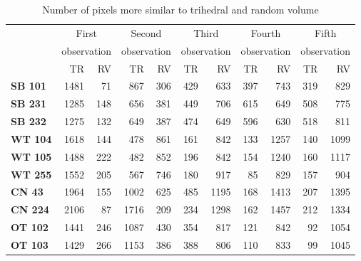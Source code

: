 \documentclass[12pt]{article}
\begin{document}
\begin{table}[hbt]
\centering
\caption{Number of pixels more similar to trihedral and random volume}\label{tab:size_sample}
\begin{tabular}{lrrrrrrrrrr}

\toprule
& \multicolumn{2}{c}{First} & \multicolumn{2}{c}{Second} & \multicolumn{2}{c}{Third} & \multicolumn{2}{c}{Fourth} & \multicolumn{2}{c}{Fifth}\\
& \multicolumn{2}{c}{observation} & \multicolumn{2}{c}{observation} & \multicolumn{2}{c}{observation} & \multicolumn{2}{c}{observation} & \multicolumn{2}{c}{observation}\\
& TR & RV & TR & RV & TR & RV & TR & RV& TR & RV\\
\cmidrule(lr){2-11}
\textbf{SB 101} & 1481 & 71 & 867 & 306 & 429 & 633 & 397 & 743 & 319 & 829\\
\textbf{SB 231} & 1285 & 148 & 656 & 381 & 449 & 706 & 615 & 649 & 508 & 775\\
\textbf{SB 232} & 1275 & 132 & 649 & 387 & 474 & 649 & 596 & 630 & 518 & 811\\
\textbf{WT 104} & 1618 & 144 & 478 & 861 & 161 & 842 & 133 & 1257 & 140 & 1099\\
\textbf{WT 105} & 1488 & 222 & 482 & 852 & 196 & 842 & 154 & 1240 & 160 & 1117\\
\textbf{WT 255} & 1552 & 205 & 567 & 746 & 180 & 917 & 85 & 829 & 157 & 904\\
\textbf{CN 43}  & 1964 & 155 & 1002 & 625 & 485 & 1195 & 168 & 1413 & 207 & 1395\\
\textbf{CN 224} & 2106 & 87 & 1716 & 209 & 234 & 1298 & 162 & 1457 & 212 & 1334\\
\textbf{OT 102} & 1441 & 246 & 1087 & 430 & 354 & 817 & 121 & 842 & 92 & 1054\\
\textbf{OT 103} & 1429 & 266 & 1153 & 386 & 388 & 806 & 110 & 833 & 99 & 1045\\
\bottomrule
\end{tabular} 
\end{table}
\end{document}
